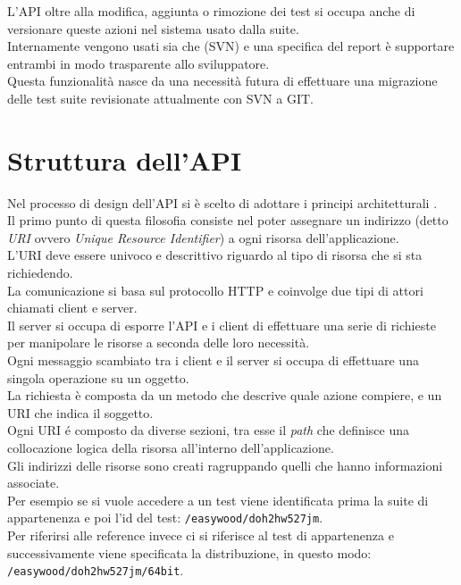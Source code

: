        L'API oltre alla modifica, aggiunta o rimozione dei test si occupa anche di versionare queste azioni nel sistema usato dalla suite.\\
        Internamente vengono usati sia \cite{Git} che \cite{SubVersion} (SVN) e una specifica del report è supportare entrambi in modo trasparente allo sviluppatore.\\
        Questa funzionalità nasce da una necessità futura di effettuare una migrazione delle test suite revisionate attualmente con SVN a GIT.\\
            
    \section{Struttura dell'API}
        Nel processo di design dell'API si è scelto di adottare i principi architetturali \cite{REST}.\\
        Il primo punto di questa filosofia consiste nel poter assegnare un indirizzo (detto \textit{URI} ovvero \textit{Unique Resource Identifier}) a ogni risorsa dell'applicazione.\\
        L'URI deve essere univoco e descrittivo riguardo al tipo di risorsa che si sta richiedendo.\\
        
        La comunicazione si basa sul protocollo HTTP e coinvolge due tipi di attori chiamati client e server.\\
        Il server si occupa di esporre l'API e i client di effettuare una serie di richieste per manipolare le risorse a seconda delle loro necessità.\\
        Ogni messaggio scambiato tra i client e il server si occupa di effettuare una singola operazione su un oggetto.\\
        La richiesta è composta da un metodo che descrive quale azione compiere, e un URI che indica il soggetto.\\
        
        Ogni URI \'e composto da diverse sezioni, tra esse il \textit{path} che definisce una collocazione logica della risorsa all'interno dell'applicazione.\\
        Gli indirizzi delle risorse sono creati ragruppando quelli che hanno informazioni associate.\\
        Per esempio se si vuole accedere a un test viene identificata prima la suite di appartenenza e poi l'id del test: \verb|/easywood/doh2hw527jm|.\\
        Per riferirsi alle reference invece ci si riferisce al test di appartenenza e successivamente viene specificata la distribuzione, in questo modo: \verb|/easywood/doh2hw527jm/64bit|.\\
        
